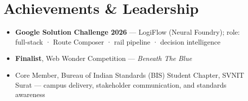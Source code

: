 \documentclass[a4paper,10pt]{article}
\begin{document}
\section{Achievements \& Leadership}
\begin{itemize}
  \item \textbf{Google Solution Challenge 2026} --- LogiFlow (Neural Foundry); role: full-stack · Route Composer · rail pipeline · decision intelligence
  \item \textbf{Finalist}, Web Wonder Competition --- \textit{Beneath The Blue}
  \item Core Member, Bureau of Indian Standards (BIS) Student Chapter, SVNIT Surat --- campus delivery, stakeholder communication, and standards awareness
\end{itemize}
\end{document}
